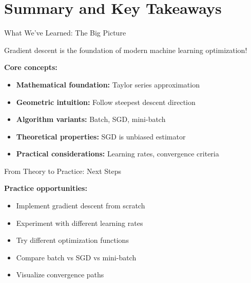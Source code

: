 \documentclass[usenames,dvipsnames]{beamer}
\begin{document}
  \section{Summary and Key Takeaways}

  \begin{frame}{What We've Learned: The Big Picture}
    \begin{keypointsbox}
    Gradient descent is the foundation of modern machine learning optimization!
    \end{keypointsbox}
    
    \pause
    \textbf{Core concepts:}
    \begin{itemize}[<+->]
        \item \textbf{Mathematical foundation:} Taylor series approximation
        \item \textbf{Geometric intuition:} Follow steepest descent direction
        \item \textbf{Algorithm variants:} Batch, SGD, mini-batch
        \item \textbf{Theoretical properties:} SGD is unbiased estimator
        \item \textbf{Practical considerations:} Learning rates, convergence criteria
    \end{itemize}
  \end{frame}

  \begin{frame}{From Theory to Practice: Next Steps}
    
    \pause
    \textbf{Practice opportunities:}
    \begin{itemize}[<+->]
        \item Implement gradient descent from scratch
        \item Experiment with different learning rates
        \item Try different optimization functions
        \item Compare batch vs SGD vs mini-batch
        \item Visualize convergence paths
    \end{itemize}
  \end{frame}
\end{document}
